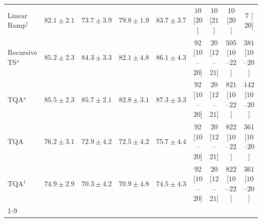 \begin{tabular}{l|cccc|cccc|}
Linear Ramp$^\dagger$ & {\cellcolor[HTML]{046299}} \color[HTML]{F1F1F1} $82.1\pm 2.1$ & {\cellcolor[HTML]{4496C3}} \color[HTML]{F1F1F1} $73.7\pm 3.9$ & {\cellcolor[HTML]{056DAB}} \color[HTML]{F1F1F1} $79.8\pm 1.9$ & {\cellcolor[HTML]{04598C}} \color[HTML]{F1F1F1} $83.7\pm 3.7$ & {\cellcolor[HTML]{FFF7F3}} \color[HTML]{000000} $10$ [$20$] & {\cellcolor[HTML]{FFF7F3}} \color[HTML]{000000} $10$ [$21$] & {\cellcolor[HTML]{FFF7F3}} \color[HTML]{000000} $10$ [$20$] & {\cellcolor[HTML]{FFF7F3}} \color[HTML]{000000} $7$ [$20$] \\
Recursive TS$^\star$ & {\cellcolor[HTML]{034D79}} \color[HTML]{F1F1F1} $85.2\pm 2.3$ & {\cellcolor[HTML]{045585}} \color[HTML]{F1F1F1} $84.3\pm 3.3$ & {\cellcolor[HTML]{046299}} \color[HTML]{F1F1F1} $82.1\pm 4.8$ & {\cellcolor[HTML]{03476F}} \color[HTML]{F1F1F1} $86.1\pm 4.3$ & {\cellcolor[HTML]{FDE4E1}} \color[HTML]{000000} $92$ [$10$--$20$] & {\cellcolor[HTML]{FFF4F0}} \color[HTML]{000000} $20$ [$12$--$21$] & {\cellcolor[HTML]{E13B98}} \color[HTML]{F1F1F1} $505$ [$10$--$22$] & {\cellcolor[HTML]{F87CA8}} \color[HTML]{F1F1F1} $381$ [$10$--$20$] \\
TQA$^\star$ & {\cellcolor[HTML]{034B76}} \color[HTML]{F1F1F1} $85.5\pm 2.3$ & {\cellcolor[HTML]{034A74}} \color[HTML]{F1F1F1} $85.7\pm 2.1$ & {\cellcolor[HTML]{045E94}} \color[HTML]{F1F1F1} $82.8\pm 3.1$ & {\cellcolor[HTML]{023D60}} \color[HTML]{F1F1F1} $87.3\pm 3.3$ & {\cellcolor[HTML]{FDE4E1}} \color[HTML]{000000} $92$ [$10$--$20$] & {\cellcolor[HTML]{FFF4F0}} \color[HTML]{000000} $20$ [$12$--$21$] & {\cellcolor[HTML]{4C006B}} \color[HTML]{F1F1F1} $821$ [$10$--$22$] & {\cellcolor[HTML]{FDD7D4}} \color[HTML]{000000} $142$ [$10$--$20$] \\
TQA & {\cellcolor[HTML]{2685BB}} \color[HTML]{F1F1F1} $76.2\pm 3.1$ & {\cellcolor[HTML]{509AC6}} \color[HTML]{F1F1F1} $72.9\pm 4.2$ & {\cellcolor[HTML]{569DC8}} \color[HTML]{F1F1F1} $72.5\pm 4.2$ & {\cellcolor[HTML]{2C89BD}} \color[HTML]{F1F1F1} $75.7\pm 4.4$ & {\cellcolor[HTML]{FDE4E1}} \color[HTML]{000000} $92$ [$10$--$20$] & {\cellcolor[HTML]{FFF4F0}} \color[HTML]{000000} $20$ [$12$--$21$] & {\cellcolor[HTML]{4B006A}} \color[HTML]{F1F1F1} $822$ [$10$--$22$] & {\cellcolor[HTML]{F986AC}} \color[HTML]{F1F1F1} $361$ [$10$--$20$] \\
TQA$^\dagger$ & {\cellcolor[HTML]{348EBF}} \color[HTML]{F1F1F1} $74.9\pm 2.9$ & {\cellcolor[HTML]{73A9CF}} \color[HTML]{F1F1F1} $70.3\pm 4.2$ & {\cellcolor[HTML]{6BA5CD}} \color[HTML]{F1F1F1} $70.9\pm 4.8$ & {\cellcolor[HTML]{3991C1}} \color[HTML]{F1F1F1} $74.5\pm 4.3$ & {\cellcolor[HTML]{FDE4E1}} \color[HTML]{000000} $92$ [$10$--$20$] & {\cellcolor[HTML]{FFF4F0}} \color[HTML]{000000} $20$ [$12$--$21$] & {\cellcolor[HTML]{4B006A}} \color[HTML]{F1F1F1} $822$ [$10$--$22$] & {\cellcolor[HTML]{F986AC}} \color[HTML]{F1F1F1} $361$ [$10$--$20$] \\
\cline{1-9}
\bottomrule
\end{tabular}
